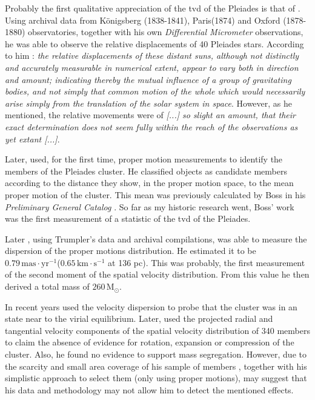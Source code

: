 Probably the first qualitative appreciation of the \gls{tvd} of the Pleiades is that of \citet{1884MNRAS..44..355P}. Using archival data from  Königsberg (1838-1841), Paris(1874) and Oxford (1878-1880) observatories, together with his own \emph{Differential Micrometer} observations, he was able to observe the relative displacements of 40 Pleiades stars. According to him \citep{1884MNRAS..44..355P}: \textit{the relative displacements of these distant suns, although not distinctly and accurately measurable in numerical extent, appear to vary both in direction and amount; indicating thereby the mutual influence of a group of gravitating bodies, and not simply that common motion of the whole which would necessarily arise simply from the translation of the solar system in space}. However, as he mentioned, the relative movements were  of \textit{[...] so slight an amount, that their exact determination does not seem fully within the reach of the observations as yet extant [...]}.

Later, \citet{Trumpler1921} used, for the first time, proper motion measurements to identify the members of the Pleiades cluster. He classified objects as candidate members according to the distance they show, in the proper motion space, to the mean proper motion of the cluster. This mean was previously calculated by Boss in his \emph{Preliminary General Catalog} \citep{1910pgcs.book.....B}. So far as my historic research went, Boss' work was the first measurement of a statistic of the \gls{tvd} of the Pleiades. 

Later \citet{1938AJ.....47...25T}, using Trumpler's data and archival compilations, was able to measure the dispersion of the proper motions distribution. He estimated it to be $0.79\,\mathrm{mas\cdot yr^{-1}}$($0.65\,\mathrm{ km\cdot s^{-1}}$ at 136 pc). This was probably, the first measurement of the second moment of the spatial velocity distribution. From this value he then derived a total mass of $260\,\mathrm{M_{\odot}}$.

In recent years \citet{Pinfield1998} used the velocity dispersion to probe that the cluster was in an state near to the virial equilibrium. Later, \citet{2006ARep...50..714L} used the projected radial and tangential velocity components of the spatial velocity distribution of 340 members to claim the absence of evidence for rotation, expansion or compression of the cluster. Also, he found no evidence to support mass segregation. However, due to the scarcity and small area coverage of his sample of members \cite[17\% of the total number of ][ candidate members, and distributed in only the central 2$^\circ$]{Bouy2015}, together with his simplistic approach to select them (only using proper motions), may suggest that his data and methodology may not allow him to detect the mentioned effects.   

